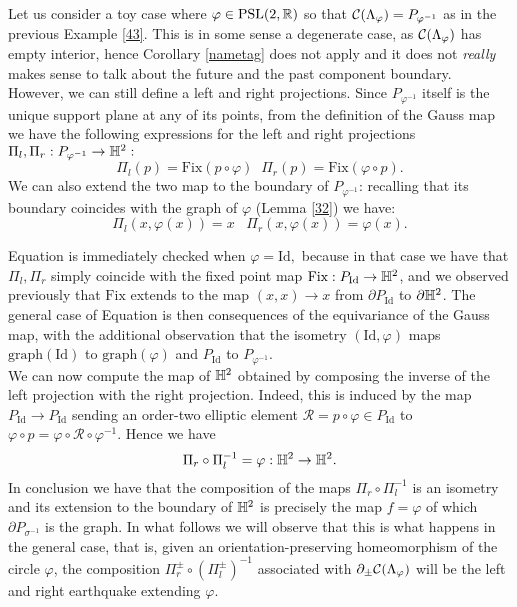 \begin{example}\label{413} Let us consider a toy case where $\varphi\in\text{PSL}(2,\mathbb{R})$ so that $\mathcal{C}(\Lambda_\varphi)=P_{\varphi^{-1}}$ as in the previous Example \ref{43}. This is in some sense a degenerate case, as $\mathcal{C}(\Lambda_\varphi)$ has empty interior, hence Corollary \ref{nametag} does not apply and it does not \textit{really} makes sense to talk about the future and the past component boundary. However, we can still define a left and right projections. Since $P_{\varphi^{-1}}$ itself is the unique support plane at any of its points, from the definition of the Gauss map we have the following expressions for the left and right projections $\Pi_l,\Pi_r:P_{\varphi^{-1}}\to\mathbb{H}^2:$
    \begin{equation}
        \Pi_l(p)=\text{Fix}(p\circ\varphi)\;\;\Pi_r(p)=\text{Fix}(\varphi\circ p).
    \end{equation}   
    We can also extend the two map to the boundary of $P_{\varphi^{-1}}$: recalling that its boundary coincides with the graph of $\varphi$ (Lemma \ref{32}) we have: 
    \begin{equation}\label{simproj}
        \Pi_l(x,\varphi(x))=x \;\;\;\Pi_r(x,\varphi(x))=\varphi(x). 
    \end{equation}
    
    Equation  is immediately checked when $\varphi=\text{Id},$ because in that case we have that $\Pi_l,\Pi_r$ simply coincide with the fixed point map $\text{Fix}:P_{\text{Id}}\to\mathbb{H}^2$, and we observed previously that $\text{Fix}$ extends to the map $(x,x)\to x$ from $\partial P_{\text{Id}}$ to $\partial\mathbb{H}^2$. The general case of Equation  is then consequences of the equivariance of the Gauss map, with the additional observation that the isometry $(\text{Id},\varphi)$ maps $\text{graph}(\text{Id})$ to $\text{graph}(\varphi)$ and $P_\text{Id}$ to $P_{\varphi^{-1}}$. \\
    We can now compute the map of $\mathbb{H}^2$ obtained by composing the inverse of the left projection with the right projection. Indeed, this is induced by the map $P_{\text{Id}}\to P_\text{Id}$ sending an order-two elliptic element $\mathcal{R}=p\circ\varphi\in P_{\text{Id}}$ to $\varphi\circ p=\varphi\circ\mathcal{R}\circ\varphi^{-1}$. Hence we have   
    \begin{equation}\label{composition}
        \Pi_r\circ\Pi_l^{-1}=\varphi:\mathbb{H}^2\to\mathbb{H}^2.
    \end{equation}
    In conclusion we have that the composition of the maps $\Pi_r\circ\Pi_l^{-1}$ is an isometry and its extension to the boundary of $\mathbb{H}^2$ is precisely the map $f=\varphi$ of which $\partial P_{\sigma^{-1}}$ is the graph. In what follows we will observe that this is what happens in the general case, that is, given an orientation-preserving homeomorphism of the circle $\varphi$, the composition $\Pi_r^\pm\circ(\Pi_l^\pm)^{-1}$ associated with $\partial_\pm\mathcal{C}(\Lambda_\varphi)$ will be the left and right earthquake extending $\varphi$.
    \end{example}

